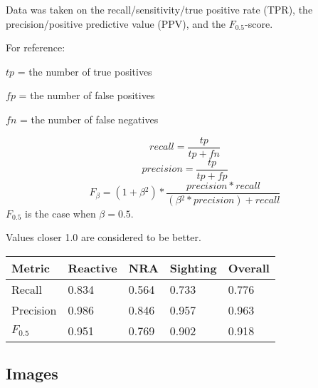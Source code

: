 \documentclass{article}
\begin{document}
Data was taken on the recall/sensitivity/true positive rate (TPR), the precision/positive predictive value (PPV),
and the \(F_{0.5}\)-score.

For reference:

\(tp\) = the number of true positives

\(fp\) = the number of false positives

\(fn\) = the number of false negatives

\[recall = \frac{tp}{tp + fn}\]
\[precision = \frac{tp}{tp + fp}\]
\[F_{\beta} = (1 + \beta{}^2) * \frac{precision * recall}{(\beta{}^2 * precision) + recall}\]
\(F_{0.5}\) is the case when \(\beta = 0.5\).

Values closer 1.0 are considered to be better.

\begin{center}
    \begin{tabular}{ | l || l | l | l || l |}
    \hline
    Metric & Reactive & NRA & Sighting & Overall\\ \hline
    Recall      & 0.834 & 0.564 & 0.733 & 0.776\\ \hline
    Precision   & 0.986 & 0.846 & 0.957 & 0.963\\ \hline
    \(F_{0.5}\) & 0.951 & 0.769 & 0.902 & 0.918\\ \hline
    \end{tabular}
\end{center}

\subsection{Images}
\label{ssec:images}

\newcommand{\showsteps}[1] {
    \begin{figure}[hp]
    \begin{minipage}[b]{0.5\linewidth}
      \centering
      \centerline{\texttt{[image: out\_1\_\#1]}}
      \centerline{(1) Selected region}\medskip
    \end{minipage}%
    \begin{minipage}[b]{0.5\linewidth}
      \centering
      \centerline{\texttt{[image: out\_2\_\#1]}}
      \centerline{(2) Preprocessing performed}\medskip
    \end{minipage}
    
    \begin{minipage}[b]{0.5\linewidth}
      \centering
      \centerline{\texttt{[image: out\_3\_\#1]}}
      \centerline{(3) Canny edge map}\medskip
    \end{minipage}%
    \begin{minipage}[b]{0.5\linewidth}
      \centering
      \centerline{\texttt{[image: out\_4\_\#1]}}
      \centerline{(4) Resulting circles}\medskip
    \end{minipage}
    \caption{State of target#1.jpg through the process}
    \label{fig:res}
    \end{figure}
}
\end{document}
